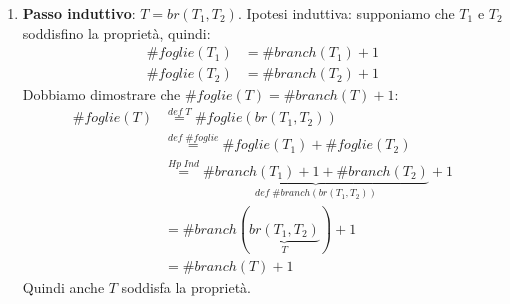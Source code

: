 \documentclass[a4paper]{article}
\begin{document}
\begin{example}
\begin{enumerate}
    \item \textbf{Passo induttivo}: \( T = br(T_1, T_2) \). Ipotesi
      induttiva: supponiamo che \( T_1 \) e \( T_2 \) soddisfino la proprietà,
      quindi:
      \[
        \begin{aligned}
          \#foglie(T_1) &= \#branch(T_1) + 1 \\
          \#foglie(T_2) &= \#branch(T_2) + 1
        \end{aligned}
      \] 
      Dobbiamo dimostrare che \( \#foglie(T) = \#branch(T) + 1 \):
      \[
        \begin{aligned}
          \#foglie(T) &\stackrel{def\; T}{=} \#foglie(br(T_1, T_2)) \\
                      &\stackrel{def \; \#foglie}{=} \#foglie(T_1) + \#foglie(T_2) \\
                      &\stackrel{Hp\; Ind}{=}
                  \underbrace{\#branch(T_1) + 1 + 
                  \#branch(T_2)}_{def\; \#branch(br(T_1, T_2))}
                  + 1 \\
                      &= \#branch(\underbrace{br(T_1, T_2)}_{T}) + 1 \\
                      &= \#branch(T) + 1
        \end{aligned}
      \] 
      Quindi anche \( T \) soddisfa la proprietà.
  \end{enumerate}
\end{example}
\end{document}

